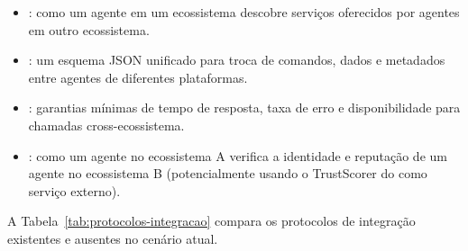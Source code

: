 \begin{itemize}
    \item {}: como um agente em um
    ecossistema descobre serviços oferecidos por agentes em outro
    ecossistema.
    \item {}: um esquema JSON unificado
    para troca de comandos, dados e metadados entre agentes de
    diferentes plataformas.
    \item {}: garantias
    mínimas de tempo de resposta, taxa de erro e disponibilidade
    para chamadas cross-ecossistema.
    \item {}: como um agente no
    ecossistema A verifica a identidade e reputação de um agente
    no ecossistema B (potencialmente usando o TrustScorer do
    \opencodeeco{} como serviço externo).
\end{itemize}

A Tabela~\ref{tab:protocolos-integracao} compara os protocolos de
integração existentes e ausentes no cenário atual.

\begin{table}[htb]
\centering
    \small
\caption{Protocolos de integração: existentes e ausentes}
\label{tab:protocolos-integracao}
\end{table}

